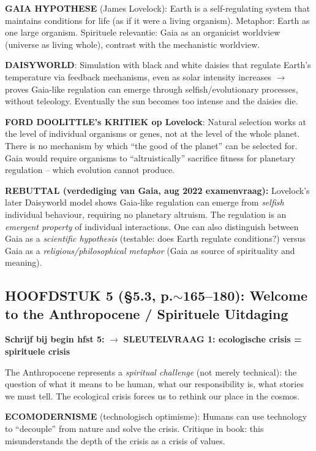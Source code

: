 \documentclass[a4paper,10pt]{article}
\begin{document}
\textbf{GAIA HYPOTHESE} (James Lovelock): Earth is a self-regulating system that maintains conditions for life (as if it were a living organism). Metaphor: Earth as one large organism. Spirituele relevantie: Gaia as an organicist worldview (universe as living whole), contrast with the mechanistic worldview.

\textbf{DAISYWORLD}: Simulation with black and white daisies that regulate Earth's temperature via feedback mechanisms, even as solar intensity increases $\to$ proves Gaia-like regulation can emerge through selfish/evolutionary processes, without teleology. Eventually the sun becomes too intense and the daisies die.

\textbf{FORD DOOLITTLE's KRITIEK op Lovelock}: Natural selection works at the level of individual organisms or genes, not at the level of the whole planet. There is no mechanism by which ``the good of the planet'' can be selected for. Gaia would require organisms to ``altruistically'' sacrifice fitness for planetary regulation -- which evolution cannot produce.

\textbf{REBUTTAL (verdediging van Gaia, aug 2022 examenvraag):} Lovelock's later Daisyworld model shows Gaia-like regulation can emerge from \textit{selfish} individual behaviour, requiring no planetary altruism. The regulation is an \textit{emergent property} of individual interactions. One can also distinguish between Gaia as a \textit{scientific hypothesis} (testable: does Earth regulate conditions?) versus Gaia as a \textit{religious/philosophical metaphor} (Gaia as source of spirituality and meaning).

\vspace{3pt}

\subsection{HOOFDSTUK 5 (§5.3, \texorpdfstring{p.$\sim$165--180}{p.~165--180}): Welcome to the Anthropocene / Spirituele Uitdaging}

\textbf{Schrijf bij begin hfst 5:} $\to$ \textbf{SLEUTELVRAAG 1: ecologische crisis = spirituele crisis}

The Anthropocene represents a \textit{spiritual challenge} (not merely technical): the question of what it means to be human, what our responsibility is, what stories we must tell. The ecological crisis forces us to rethink our place in the cosmos.

\textbf{ECOMODERNISME} (technologisch optimisme): Humans can use technology to ``decouple'' from nature and solve the crisis. Critique in book: this misunderstands the depth of the crisis as a crisis of values.
\end{document}
